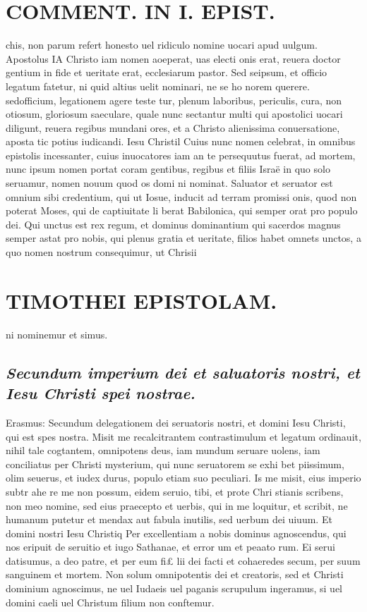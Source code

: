 \documentclass{article}
\begin{document}
\begin{pages}
\section*{COMMENT. IN I. EPIST. }
\marginpar{[ p.4 ]}\pstart chis, non parum refert honesto uel ridiculo nomine uocari apud uulgum.  \pend\pstart Apostolus IA Christo iam nomen aoeperat, uas electi onis erat, reuera doctor gentium in fide et ueritate erat, ecclesiarum pastor. Sed seipsum, et officio legatum fatetur, ni quid altius uelit nominari, ne se ho norem querere. sedofficium, legationem agere teste tur, plenum laboribus, periculis, cura, non otiosum, gloriosum saeculare, quale nunc sectantur multi qui apostolici uocari diligunt, reuera regibus mundani ores, et a Christo alienissima conuersatione, aposta tic potius iudicandi.  \pend\pstart Iesu Christil Cuius nunc nomen celebrat, in omnibus epistolis incessanter, cuius inuocatores iam an te persequutus fuerat, ad mortem, nunc ipsum nomen portat coram gentibus, regibus et filiis Israë in quo solo seruamur, nomen nouum quod os domi ni nominat. Saluator et seruator est omnium sibi credentium, qui ut Iosue, inducit ad terram promissi onis, quod non poterat Moses, qui de captiuitate li berat Babilonica, qui semper orat pro populo dei. Qui unctus est rex regum, et dominus dominantium qui sacerdos magnus semper astat pro nobis, qui plenus gratia et ueritate, filios habet omnets unctos, a quo nomen nostrum consequimur, ut Chrisii  \pend
\section*{TIMOTHEI EPISTOLAM. }
\marginpar{[ p.5 ]}\pstart ni nominemur et simus.  \pend
{}
{}
\subsection*{\textit{Secundum imperium dei et saluatoris nostri, et Iesu Christi spei nostrae. }}\pstart Erasmus: Secundum delegationem dei seruatoris nostri, et domini Iesu Christi, qui est spes nostra. Misit me recalcitrantem contrastimulum et legatum ordinauit, nihil tale cogtantem, omnipotens deus, iam mundum seruare uolens, iam conciliatus per Christi mysterium, qui nunc seruatorem se exhi bet piissimum, olim seuerus, et iudex durus, populo etiam suo peculiari. Is me misit, eius imperio subtr ahe re me non possum, eidem seruio, tibi, et prote Chri stianis scribens, non meo nomine, sed eius praecepto et uerbis, qui in me loquitur, et scribit, ne humanum putetur et mendax aut fabula inutilis, sed uerbum dei uiuum.  \pend\pstart Et domini nostri Iesu Christiq Per excellentiam a nobis dominus agnoscendus, qui nos eripuit de seruitio et iugo Sathanae, et error um et peaato rum. Ei serui datisumus, a deo patre, et per eum fi£ lii dei facti et cohaeredes secum, per suum sanguinem et mortem. Non solum omnipotentis dei et creatoris, sed et Christi dominium agnoscimus, ne uel Iudaeis uel paganis scrupulum ingeramus, si uel domini caeli uel Christum filium non conftemur.  \pend

\end{pages}
\end{document}
